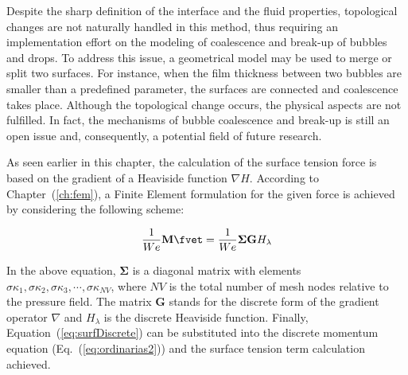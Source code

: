 \documentclass[a4paper,portuges]{article}
\begin{document}
Despite the sharp definition of the interface and the fluid properties,
topological changes are not naturally handled in this method, thus
requiring an implementation effort on the modeling of coalescence and
break-up of bubbles and drops. To address this issue, a geometrical
model may be used to merge or split two surfaces. For instance, when the
film thickness between two bubbles are smaller than a predefined
parameter, the surfaces are connected and coalescence takes place.
Although the topological change occurs, the physical aspects are not
fulfilled. In fact, the mechanisms of bubble coalescence and break-up is
still an open issue and, consequently, a potential field of future
research. 

As seen earlier in this chapter, the calculation of the surface tension
force is based on the gradient of a Heaviside function $\nabla H$.
According to Chapter~(\ref{ch:fem}), a Finite Element formulation for
the given force is achieved by considering the following scheme:


\begin{equation}
	\frac{1}{We}\mathbf{M} \fvet 
	= 
	\frac{1}{We} \mathbf{\Sigma} \mathbf{G} H_{\lambda}
	\label{eq:surfDiscrete}
\end{equation}

In the above equation, $\mathbf{\Sigma}$ is a diagonal matrix with
elements $\sigma \kappa_1, \sigma \kappa_2, \sigma \kappa_3,\cdots,
\sigma \kappa_{NV}$, where $NV$ is the total number of mesh nodes
relative to the pressure field. The matrix $\mathbf{G}$ stands for the
discrete form of the gradient operator $\nabla$ and $H_{\lambda}$ is the
discrete Heaviside function. Finally, Equation~(\ref{eq:surfDiscrete})
can be substituted into the discrete momentum equation
(Eq.~(\ref{eq:ordinarias2})) and the surface tension term calculation
achieved. 
\end{document}
